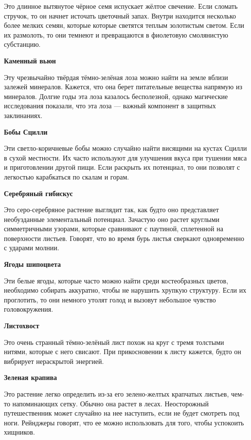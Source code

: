 \documentclass[a4paper, 9pt, twocolumn]{book}
\newcommand{\partc}[2][]{{
		\bigskip
		\noindent
		\hspace{-0.25cm}
		\fontsize{11pt}{13.2}
		\color{sectioncolor}
		\textbf{#2}}
	
	{
		\ifx\relax#1\relax
		\else
		\noindent
		\normalcolor
		\textbf{#1}}
	\bigskip
	\fi
}
\begin{document}
	\noindent Это длинное вытянутое чёрное семя испускает жёлтое свечение. Если сломать стручок, то он начнет источать цветочный запах. Внутри находится несколько более мелких семян, которые  которые светятся теплым золотистым светом. Если их размолоть, то они темнеют и превращаются в фиолетовую смолянистую субстанцию.
	
	\partc{Каменный вьюн}
	
	\noindent Эту чрезвычайно твёрдая тёмно-зелёная лоза можно найти на земле вблизи залежей минералов. Кажется, что она берет питательные вещества напрямую из минералов. Долгие годы эта лоза казалось бесполезной, однако магические исследования показали, что эта лоза --- важный компонент в защитных заклинаниях.
	
	\partc{Бобы Сцилли}
	
	\noindent Эти светло-коричневые бобы можно случайно найти висящими на кустах Сцилли в сухой местности. Их часто используют для улучшения вкуса при тушении мяса и приготовлении другой пищи. Если раскрыть их потенциал, то они позволят с легкостью карабкаться по скалам и горам.
	
	\partc{Серебряный гибискус}
	
	\noindent Это серо-серебряное растение выглядит так, как будто оно представляет необузданные элементальный потенциал. Зачастую оно растет круглыми симметричными узорами, которые сравнивают с паутиной, сплетенной на поверхности листьев. Говорят, что во время бурь листья сверкают одновременно с ударами молнии.
	
	\partc{Ягоды шипоцвета}
	
	\noindent Эти белые ягоды, которые часто можно найти среди костеобразных цветов, необходимо собирать аккуратно, чтобы не нарушить хрупкую структуру. Если их проглотить, то они немного утолят голод и вызовут небольшое чувство головокружения.
	
	\partc{Листохвост}
	
	\noindent Это очень странный тёмно-зелёный лист похож на круг с тремя толстыми нитями, которые с него свисают. При прикосновении к листу кажется, будто он вибрирует нераскрытой энергией.
	
	\partc{Зеленая крапива}
	
	\noindent Это растение легко определить из-за его зелено-желтых крапчатых листьев, чем-то напоминающих сетку. Обычно она растет в лесах. Неосторожный путешественник может случайно на нее наступить, если не будет смотреть под ноги. Рейнджеры говорят, что ее можно использовать для того, чтобы успокоить хищников.
	
\end{document}
